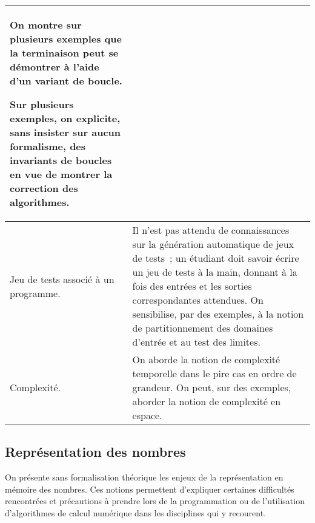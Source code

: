 \begin{longtable}{|p{\lnotion}|p{\comment}|}
    On montre sur plusieurs exemples que la terminaison peut se démontrer à l'aide d'un variant de boucle.

    Sur plusieurs exemples, on explicite, sans insister sur aucun formalisme, des invariants de boucles en vue de montrer la correction des algorithmes.
    \\ \hline
    Jeu de tests associé à un programme.
    &
    Il n'est pas attendu de connaissances sur la génération automatique de jeux de tests~; un étudiant doit savoir écrire un jeu de tests à la main, donnant à la fois des entrées et les sorties correspondantes attendues. On sensibilise, par des exemples, à la notion de partitionnement des domaines d'entrée et au test des limites. \\ \hline

    Complexité. & On aborde la notion de complexité temporelle dans le pire cas en ordre de grandeur. On peut, sur des exemples, aborder la notion de complexité en espace. \\ \hline
\end{longtable}


\subsection{Représentation des nombres}
On présente sans formalisation théorique les enjeux de la
représentation en mémoire des nombres. Ces notions permettent
d'expliquer certaines difficultés rencontrées et précautions à prendre
lors de la programmation ou de l'utilisation d'algorithmes de calcul
numérique dans les disciplines qui y recourent.

